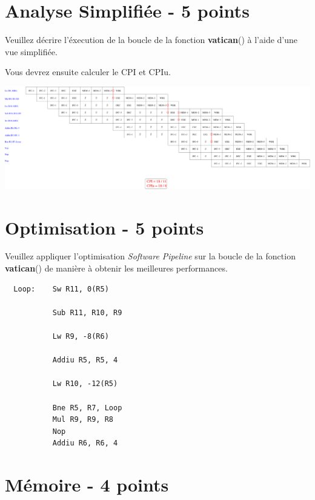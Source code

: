 %
%

\section{Analyse Simplifi\'ee - 5 points}

Veuillez d\'ecrire l'\'execution de la boucle de la fonction \textbf{vatican}()
\`a l'aide d'une vue simplifi\'ee.

Vous devrez ensuite calculer le CPI et CPIu.

\begin{correction}

  \begin{center}
    \includegraphics[scale=0.33]{figures/correction-analyse-simplifiee.pdf}
  \end{center}

\end{correction}

%
%

\section{Optimisation - 5 points}

Veuillez appliquer l'optimisation \textit{Software Pipeline} sur
la boucle de la fonction \textbf{vatican}() de mani\`ere \`a obtenir
les meilleures performances.

\begin{correction}

  \begin{verbatim}
  Loop:    Sw R11, 0(R5)

           Sub R11, R10, R9

           Lw R9, -8(R6)

           Addiu R5, R5, 4

           Lw R10, -12(R5)

           Bne R5, R7, Loop
           Mul R9, R9, R8
           Nop
           Addiu R6, R6, 4
  \end{verbatim}

\end{correction}

%
%

\section{M\'emoire - 4 points}


